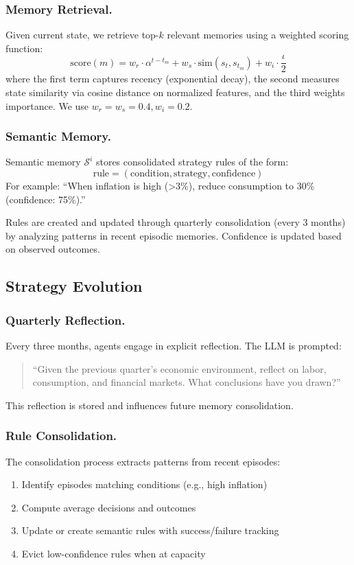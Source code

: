 \documentclass[runningheads]{llncs}
\begin{document}
\subsubsection{Memory Retrieval.}
Given current state, we retrieve top-$k$ relevant memories using a weighted scoring function:
\begin{equation}
\text{score}(m) = w_r \cdot \alpha^{t - t_m} + w_s \cdot \text{sim}(s_t, s_{t_m}) + w_i \cdot \frac{\iota}{2}
\end{equation}
where the first term captures recency (exponential decay), the second measures state similarity via cosine distance on normalized features, and the third weights importance. We use $w_r = w_s = 0.4, w_i = 0.2$.

\subsubsection{Semantic Memory.}
Semantic memory $\mathcal{S}^i$ stores consolidated strategy rules of the form:
\begin{equation}
\text{rule} = (\text{condition}, \text{strategy}, \text{confidence})
\end{equation}
For example: ``When inflation is high (>3\%), reduce consumption to 30\% (confidence: 75\%).''

Rules are created and updated through quarterly consolidation (every 3 months) by analyzing patterns in recent episodic memories. Confidence is updated based on observed outcomes.

\subsection{Strategy Evolution}

\subsubsection{Quarterly Reflection.}
Every three months, agents engage in explicit reflection. The LLM is prompted:
\begin{quote}
``Given the previous quarter's economic environment, reflect on labor, consumption, and financial markets. What conclusions have you drawn?''
\end{quote}
This reflection is stored and influences future memory consolidation.

\subsubsection{Rule Consolidation.}
The consolidation process extracts patterns from recent episodes:
\begin{enumerate}
    \item Identify episodes matching conditions (e.g., high inflation)
    \item Compute average decisions and outcomes
    \item Update or create semantic rules with success/failure tracking
    \item Evict low-confidence rules when at capacity
\end{enumerate}
\end{document}
